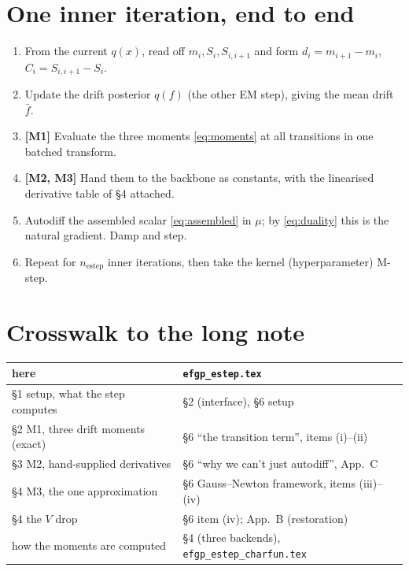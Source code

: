 \documentclass[11pt]{article}
\begin{document}
\section{One inner iteration, end to end}

\begin{enumerate}[leftmargin=2.2em,itemsep=2pt]
\item From the current $q(x)$, read off $m_i,S_i,S_{i,i+1}$ and form
  $d_i=m_{i+1}-m_i$, $C_i=S_{i,i+1}-S_i$.
\item Update the drift posterior $q(f)$ (the other EM step), giving the
  mean drift $\bar f$.
\item \textbf{[M1]} Evaluate the three moments \eqref{eq:moments} at all
  transitions in one batched transform.
\item \textbf{[M2, M3]} Hand them to the backbone as constants, with the
  linearised derivative table of \S4 attached.
\item Autodiff the assembled scalar \eqref{eq:assembled} in $\mu$; by
  \eqref{eq:duality} this is the natural gradient. Damp and step.
\item Repeat for $n_{\mathrm{estep}}$ inner iterations, then take the
  kernel (hyperparameter) M-step.
\end{enumerate}

\section*{Crosswalk to the long note}

\noindent
\begin{tabular}{@{}l l@{}}
\toprule
here & \texttt{efgp\_estep.tex} \\
\midrule
\S1 setup, what the step computes & \S2 (interface), \S6 setup \\
\S2 M1, three drift moments (exact) & \S6 ``the transition term'', items (i)--(ii) \\
\S3 M2, hand-supplied derivatives & \S6 ``why we can't just autodiff'', App.~C \\
\S4 M3, the one approximation & \S6 Gauss--Newton framework, items (iii)--(iv) \\
\S4 the $V$ drop & \S6 item (iv); App.~B (restoration) \\
how the moments are computed & \S4 (three backends), \texttt{efgp\_estep\_charfun.tex} \\
\bottomrule
\end{tabular}
\end{document}
